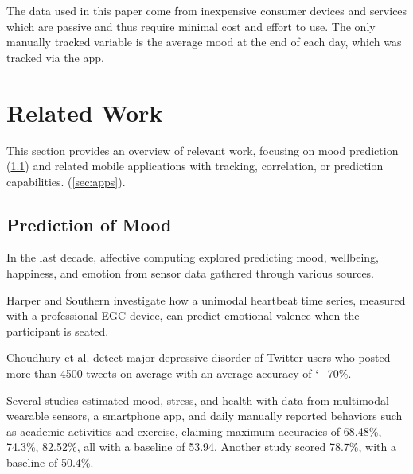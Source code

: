 \documentclass[conference]{IEEEtran}
\begin{document}



The data used in this paper come from inexpensive consumer devices and services which are passive and thus require minimal cost and effort to use.
The only manually tracked variable is the average mood at the end of each day, which was tracked via the app. 







\section{Related Work}
This section provides an overview of relevant work, focusing on mood prediction (\ref{sec:wellbeing}) and related mobile applications with tracking, correlation, or prediction capabilities. (\ref{sec:apps}).

\subsection{Prediction of Mood}
\label{sec:wellbeing}

In the last decade, affective computing explored predicting mood, wellbeing, happiness, and emotion from sensor data gathered through various sources.

Harper and Southern\cite{harper_bayesian_2020} investigate how a unimodal heartbeat time series, measured with a professional EGC device, can predict emotional valence when the participant is seated. 

Choudhury et al. detect major depressive disorder of Twitter users who posted more than 4500 tweets on average with an average accuracy of \char`~ 70\%\cite{choudhury_predicting_2013}.

Several studies estimated mood, stress, and health with data from multimodal wearable sensors, a smartphone app, and daily manually reported behaviors such as academic activities and exercise, claiming maximum accuracies of
 68.48\%\cite{jaques_predicting_2015},
 74.3\%\cite{jaques_multi-task_2015},
 82.52\%\cite{jaques_multi-task_2016}, all with a baseline of 53.94. Another study scored 78.7\%, with a baseline of 50.4\%\cite{taylor_personalized_2020}. 
 
\end{document}
